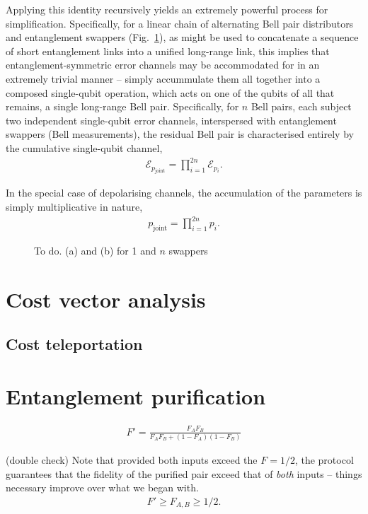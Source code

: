 \documentclass[aps,pra,twocolumn,amsmath,amssymb,nofootinbib,superscriptaddress]{revtex4}
\begin{document}
Applying this identity recursively yields an extremely powerful process for simplification. Specifically, for a linear chain of alternating Bell pair distributors and entanglement swappers (Fig.~\ref{fig:error_swapping}), as might be used to concatenate a sequence of short entanglement links into a unified long-range link, this implies that entanglement-symmetric error channels may be accommodated for in an extremely trivial manner -- simply accummulate them all together into a composed single-qubit operation, which acts on one of the qubits of all that remains, a single long-range Bell pair. Specifically, for $n$ Bell pairs, each subject two independent single-qubit error channels, interspersed with entanglement swappers (Bell measurements), the residual Bell pair is characterised entirely by the cumulative single-qubit channel,
\begin{align}
\mathcal{E}_{p_\mathrm{joint}} = \prod_{i=1}^{2n} \mathcal{E}_{p_i}.
\end{align}

In the special case of depolarising channels, the accumulation of the parameters is simply multiplicative in nature,
\begin{align}
p_\mathrm{joint} = \prod_{i=1}^{2n} p_i.	
\end{align}

\begin{figure}
\caption{To do. (a) and (b) for 1 and $n$ swappers}\label{fig:error_swapping}
\end{figure}

\section{Cost vector analysis}

\subsection{Cost teleportation}



\section{Entanglement purification}

\begin{align}
F' = \frac{F_A F_B}{F_A F_B + (1-F_A)(1-F_B)}
\end{align}

(double check) Note that provided both inputs exceed the \mbox{$F=1/2$}, the protocol guarantees that the fidelity of the purified pair exceed that of \textit{both} inputs -- things necessary improve over what we began with.
\begin{align}
F' \geq F_{A,B} \geq 1/2.
\end{align}
\end{document}
